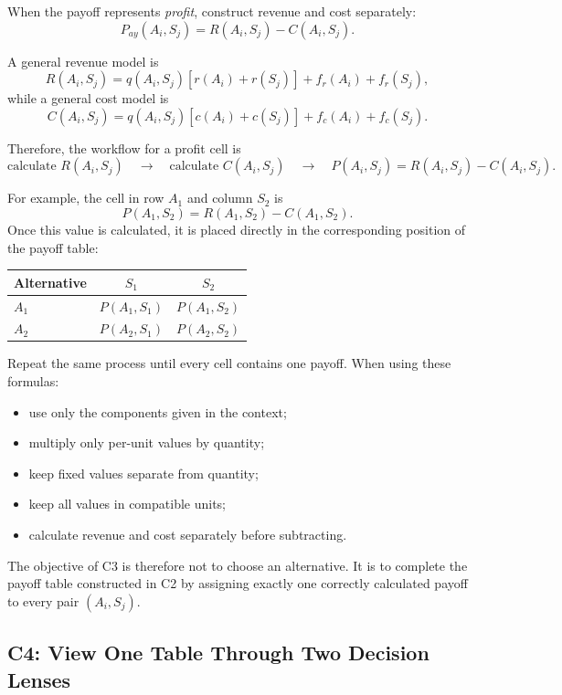 	When the payoff represents \emph{profit}, construct revenue and cost
	separately:
	\[
	P_{ay}(A_i,S_j)=R(A_i,S_j)-C(A_i,S_j).
	\]
	
	A general revenue model is
	\[
	R(A_i,S_j)
	=
	q(A_i,S_j)
	\left[
	r(A_i)+r(S_j)
	\right]
	+
	f_r(A_i)
	+
	f_r(S_j),
	\]
	while a general cost model is
	\[
	C(A_i,S_j)
	=
	q(A_i,S_j)
	\left[
	c(A_i)+c(S_j)
	\right]
	+
	f_c(A_i)
	+
	f_c(S_j).
	\]
	
	Therefore, the workflow for a profit cell is
	\[
	\boxed{\text{calculate }R(A_i,S_j)}
	\quad\longrightarrow\quad
	\boxed{\text{calculate }C(A_i,S_j)}
	\quad\longrightarrow\quad
	\boxed{P(A_i,S_j)=R(A_i,S_j)-C(A_i,S_j)}.
	\]
	
	For example, the cell in row \(A_1\) and column \(S_2\) is
	\[
	P(A_1,S_2)=R(A_1,S_2)-C(A_1,S_2).
	\]
	Once this value is calculated, it is placed directly in the corresponding
	position of the payoff table:
	\begin{center}
		\begin{tabular}{lcc}
			\toprule
			Alternative & $S_1$ & $S_2$ \\
			\midrule
			$A_1$ & $P(A_1,S_1)$ & $\boxed{P(A_1,S_2)}$ \\
			$A_2$ & $P(A_2,S_1)$ & $P(A_2,S_2)$ \\
			\bottomrule
		\end{tabular}
	\end{center}
	
	Repeat the same process until every cell contains one payoff. When using these formulas:
	\begin{itemize}
		\item use only the components given in the context;
		\item multiply only per-unit values by quantity;
		\item keep fixed values separate from quantity;
		\item keep all values in compatible units;
		\item calculate revenue and cost separately before subtracting.
	\end{itemize}

	
	
	The objective of C3 is therefore not to choose an alternative. It is to
	complete the payoff table constructed in C2 by assigning exactly one
	correctly calculated payoff to every pair \((A_i,S_j)\).
	
	

	
	\subsection{C4: View One Table Through Two Decision Lenses}
	\label{sec:c4-decision-lenses}
	
